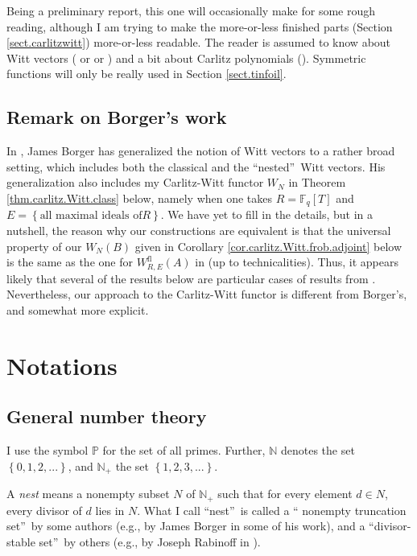 \documentclass[numbers=enddot,12pt,final,onecolumn,notitlepage]{scrartcl}%
\theoremstyle{definition}
\begin{document}
Being a preliminary report, this one will occasionally make for some rough
reading, although I am trying to make the more-or-less finished parts (Section
\ref{sect.carlitzwitt}) more-or-less readable. The reader is assumed to know
about Witt vectors (\cite{rabinoff-witt} or \cite{hw-witt1} or \cite[\S 1]%
{hesselholt-drw}) and a bit about Carlitz polynomials (\cite{kc-carlitz}).
Symmetric functions will only be really used in Section \ref{sect.tinfoil}.

\subsection{Remark on Borger's work}

In \cite[\S 1--\S 2]{jb-bg1}, James Borger has generalized the notion of Witt
vectors to a rather broad setting, which includes both the classical and the
\textquotedblleft nested\textquotedblright\ Witt vectors. His generalization
also includes my Carlitz-Witt functor $W_{N}$ in Theorem
\ref{thm.carlitz.Witt.class} below, namely when one takes $R=\mathbb{F}%
_{q}\left[  T\right]  $ and $E=\left\{  \text{all maximal ideals of
}R\right\}  $. We have yet to fill in the details, but in a nutshell, the
reason why our constructions are equivalent is that the universal property of
our $W_{N}\left(  B\right)  $ given in Corollary
\ref{cor.carlitz.Witt.frob.adjoint} below is the same as the one for
$W_{R,E}^{\operatorname*{fl}}\left(  A\right)  $ in \cite[Proposition 1.9
(c)]{jb-bg1} (up to technicalities). Thus, it appears likely that several of
the results below are particular cases of results from \cite{jb-bg1}.
Nevertheless, our approach to the Carlitz-Witt functor is different from
Borger's, and somewhat more explicit.

\section{\label{sect.nots}Notations}

\subsection{General number theory}

I use the symbol $\mathbb{P}$ for the set of all primes. Further, $\mathbb{N}$
denotes the set $\left\{  0,1,2,...\right\}  $, and $\mathbb{N}_{+}$ the set
$\left\{  1,2,3,...\right\}  $.

A \textit{nest} means a nonempty subset $N$ of $\mathbb{N}_{+}$ such that for
every element $d\in N$, every divisor of $d$ lies in $N$. What I call
\textquotedblleft nest\textquotedblright\ is called a \textquotedblleft
nonempty truncation set\textquotedblright\ by some authors (e.g., by James
Borger in some of his work), and a \textquotedblleft divisor-stable
set\textquotedblright\ by others (e.g., by Joseph Rabinoff in
\cite{rabinoff-witt}).
\end{document}
